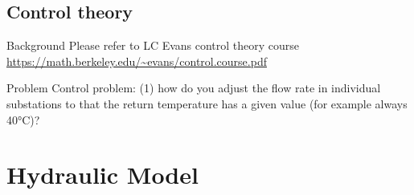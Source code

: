 \documentclass[xcolor=dvipsnames]{beamer}
\begin{document}




		

  

\subsection{Control theory}

\begin{frame}{Background}
	Please refer to LC Evans control theory course \url{https://math.berkeley.edu/~evans/control.course.pdf}
\end{frame}

\begin{frame}{Problem}
	Control problem: (1) how do you adjust the flow rate in individual substations to that the return temperature has a given value (for example always 40°C)?
\end{frame}

\section{Hydraulic Model}
\end{document}
